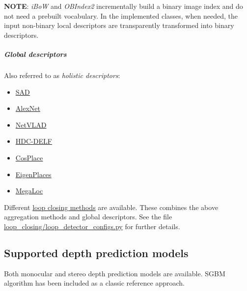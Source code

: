 \documentclass{article}
\providecommand{\tightlist}{%
  \setlength{\itemsep}{0pt}\setlength{\parskip}{0pt}}
\let\oldsubparagraph\subparagraph
\renewcommand{\subparagraph}[1]{\oldsubparagraph{#1}\mbox{}}
\begin{document}
\textbf{NOTE}: \emph{iBoW} and \emph{OBIndex2} incrementally build a
binary image index and do not need a prebuilt vocabulary. In the
implemented classes, when needed, the input non-binary local descriptors
are transparently transformed into binary descriptors.

\hypertarget{global-descriptors}{%
\subparagraph{Global descriptors}\label{global-descriptors}}

Also referred to as \emph{holistic descriptors}:

\begin{itemize}
\tightlist
\item
  \href{https://ieeexplore.ieee.org/document/6224623}{SAD}
\item
  \href{https://github.com/BVLC/caffe/tree/master/models/bvlc_alexnet}{AlexNet}
\item
  \href{https://www.di.ens.fr/willow/research/netvlad/}{NetVLAD} \cite{arandjelovic2016netvlad}
\item
  \href{https://www.tu-chemnitz.de/etit/proaut/hdc_desc}{HDC-DELF}
\item
  \href{https://github.com/gmberton/CosPlace}{CosPlace} \cite{berton2023cosplace}
\item
  \href{https://github.com/gmberton/EigenPlaces}{EigenPlaces} \cite{berton2023eigenplaces}
\item
  \href{https://github.com/gmberton/MegaLoc}{MegaLoc} \cite{berton2025megaloc}	
\end{itemize}

Different \protect\hyperlink{loop-closing}{loop closing methods} are
available. These combines the above aggregation methods and global
descriptors. See the file \url{loop_closing/loop_detector_configs.py}
for further details.

\hypertarget{supported-depth-prediction-models}{%
\subsection{Supported depth prediction
models}\label{supported-depth-prediction-models}}

Both monocular and stereo depth prediction models are available. SGBM
algorithm has been included as a classic reference approach.
\end{document}
